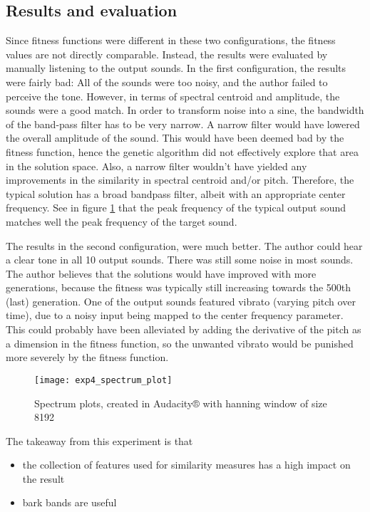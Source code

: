 \subsection{Results and evaluation}
Since fitness functions were different in these two configurations, the fitness values are not directly comparable. Instead, the results were evaluated by manually listening to the output sounds. In the first configuration, the results were fairly bad: All of the sounds were too noisy, and the author failed to perceive the tone. However, in terms of spectral centroid and amplitude, the sounds were a good match. In order to transform noise into a sine, the bandwidth of the band-pass filter has to be very narrow. A narrow filter would have lowered the overall amplitude of the sound. This would have been deemed bad by the fitness function, hence the genetic algorithm did not effectively explore that area in the solution space. Also, a narrow filter wouldn't have yielded any improvements in the similarity in spectral centroid and/or pitch. Therefore, the typical solution has a broad bandpass filter, albeit with an appropriate center frequency. See in figure \ref{fig:exp4_spectrum_plot} that the peak frequency of the typical output sound matches well the peak frequency of the target sound.

The results in the second configuration, were much better. The author could hear a clear tone in all 10 output sounds. There was still some noise in most sounds. The author believes that the solutions would have improved with more generations, because the fitness was typically still increasing towards the 500th (last) generation. One of the output sounds featured vibrato (varying pitch over time), due to a noisy input being mapped to the center frequency parameter. This could probably have been alleviated by adding the derivative of the pitch as a dimension in the fitness function, so the unwanted vibrato would be punished more severely by the fitness function.

\begin{figure}[h]
    \centering
    \texttt{[image: exp4\_spectrum\_plot]}
    \caption{Spectrum plots, created in Audacity® with hanning window of size 8192}
    \label{fig:exp4_spectrum_plot}
\end{figure}

The takeaway from this experiment is that
\begin{itemize}  
\item the collection of features used for similarity measures has a high impact on the result
\item bark bands are useful
\end{itemize}

